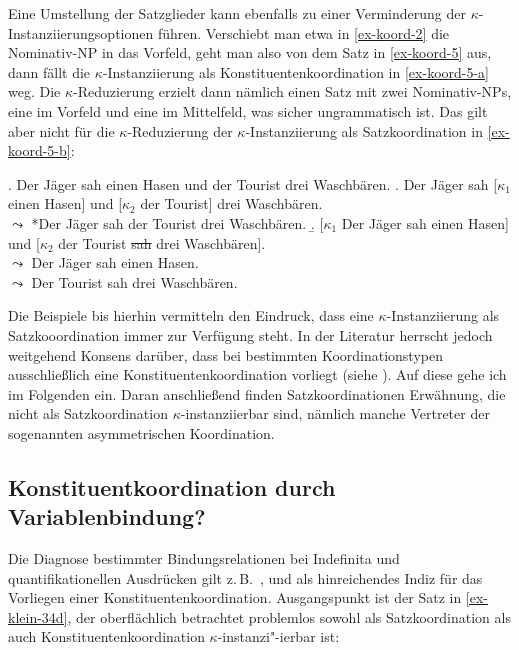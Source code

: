 Eine Umstellung der Satzglieder kann ebenfalls zu einer Verminderung der $\kappa$-Instanziierungs\-optionen führen. Verschiebt man etwa in \ref{ex-koord-2} die Nominativ-NP in das Vorfeld, geht man also von dem Satz in \ref{ex-koord-5} aus, dann fällt die $\kappa$-Instanziierung als Konstituentenkoordination in \ref{ex-koord-5-a} weg. Die $\kappa$-Reduzierung erzielt dann nämlich einen Satz mit zwei Nominativ-NPs, eine im Vorfeld und eine im Mittelfeld, was sicher ungrammatisch ist. Das gilt aber nicht für die $\kappa$-Reduzierung der $\kappa$-Instanziierung als Satzkoordination in \ref{ex-koord-5-b}:

\ex. \label{ex-koord-5} Der Jäger sah einen Hasen und der Tourist drei Waschbären.
\a. \label{ex-koord-5-a} Der Jäger sah [$\kappa_1$ einen Hasen] und [$\kappa_2$ der Tourist] drei Waschbären. \\
$\leadsto$ *Der Jäger sah der Tourist drei Waschbären.\pagebreak
\b. \label{ex-koord-5-b} [$\kappa_1$ Der Jäger sah einen Hasen] und [$\kappa_2$ der Tourist \sout{sah} drei Waschbären]. \\  
$\leadsto$ Der Jäger sah einen Hasen. \\
$\leadsto$ Der Tourist sah drei Waschbären.

Die Beispiele bis hierhin vermitteln den Eindruck, dass eine $\kappa$-Instanziierung als Satzkooordination immer zur Verfügung steht. In der Literatur herrscht jedoch weitgehend Konsens darüber, dass bei bestimmten Koordinationstypen ausschlie\ss lich eine Konstituentenkoordination vorliegt (siehe \citealt[Abschnitt~2.3]{Hartmann:00}). Auf diese gehe ich im Folgenden ein. Daran anschlie\ss end finden Satzkoordinationen Erwähnung, die nicht als Satzkoordination $\kappa$-instanziierbar sind, nämlich manche Vertreter der sogenannten asymmetrischen Koordination.   


\subsection{Konstituentkoordination durch Variablenbindung?}

Die Diagnose bestimmter Bindungsrelationen bei Indefinita und quantifikationellen Ausdrü\-cken gilt z.\,B.\  \citet[773]{Klein:93}, \citet[33ff]{Hartmann:00} und \citet[31ff]{Reich:09} als hinreichendes Indiz für das Vorliegen einer Konstituentenkoordination. Ausgangspunkt ist der Satz in \ref{ex-klein-34d}, der oberflächlich betrachtet problemlos sowohl als Satzkoordination als auch Konstituentenkoordination $\kappa$-instanzi"-ierbar ist: 

